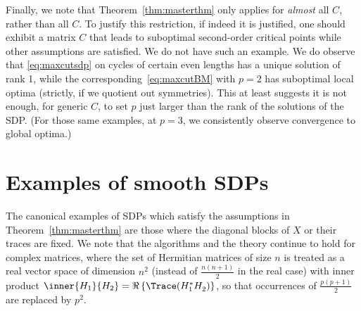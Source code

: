 \documentclass{article}
\newcommand{\1}{\mathbf{1}}
\begin{document}

Finally, we note that Theorem~\ref{thm:masterthm} only applies for \emph{almost} all $C$, rather than all $C$. To justify this restriction, if indeed it is justified, one should exhibit a matrix $C$ that leads to suboptimal second-order critical points while other assumptions are satisfied. We do not have such an example. We do observe that \eqref{eq:maxcutsdp} on cycles of certain even lengths
has a unique solution of rank 1, while the corresponding~\eqref{eq:maxcutBM} with $p=2$ has suboptimal local optima (strictly, if we quotient out symmetries). This at least suggests it is not enough, for generic $C$, to set $p$ just larger than the rank of the solutions of the SDP. (For those same examples, at $p=3$, we consistently observe convergence to global optima.)

\section{Examples of smooth SDPs}\label{sec:examples}

The canonical examples of SDPs which satisfy the assumptions in Theorem~\ref{thm:masterthm} are those where the diagonal blocks of $X$ or their traces are fixed. We note that the algorithms and the theory continue to hold for complex matrices, where the set of Hermitian matrices of size $n$ is treated as a real vector space of dimension $n^2$ (instead of $\frac{n(n+1)}{2}$ in the real case) with inner product $\inner{H_1}{H_2} = \Re\left\{ \Trace(H_1^*H_2^{}) \right\}$, so that occurrences of $\frac{p(p+1)}{2}$ are replaced by $p^2$.
\end{document}
